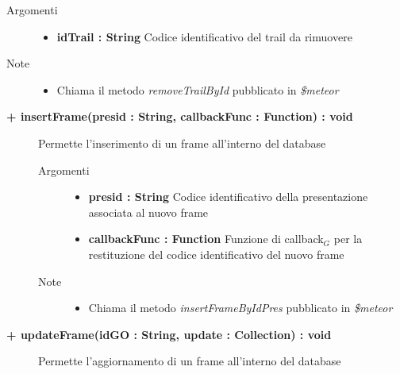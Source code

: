 \begin{description}
\begin{description}
		\begin{description}
			\item[Argomenti] \hfill
				\begin{itemize}
					\item \textbf{idTrail : String			} \hfill
					Codice identificativo del trail da rimuovere
					
				\end{itemize}
			\item[Note] \hfill
			\begin{itemize}
					\item Chiama il metodo \textit{removeTrailById} pubblicato in \textit{\$meteor}
			\end{itemize}
		\end{description}
	\end{description}
	
	\begin{description}
		\item[\textbf{\color{blue}+ insertFrame(presid : String, callbackFunc : Function) : void			}] \hfill
			Permette l'inserimento di un frame all'interno del database
			
		\begin{description}
			\item[Argomenti] \hfill
				\begin{itemize}
					\item \textbf{presid : String			} \hfill
					Codice identificativo della presentazione associata al nuovo frame
					\item \textbf{callbackFunc : Function			} \hfill
					Funzione di callback$_G$ per la restituzione del codice identificativo del nuovo frame
					
				\end{itemize}
			\item[Note] \hfill
			\begin{itemize}
					\item Chiama il metodo \textit{insertFrameByIdPres} pubblicato in \textit{\$meteor}
			\end{itemize}
		\end{description}
	\end{description}
	
	\begin{description}
		\item[\textbf{\color{blue}+ updateFrame(idGO : String, update : Collection) : void			}] \hfill
			Permette l'aggiornamento di un frame all'interno del database
			

\end{description}
\end{description}
